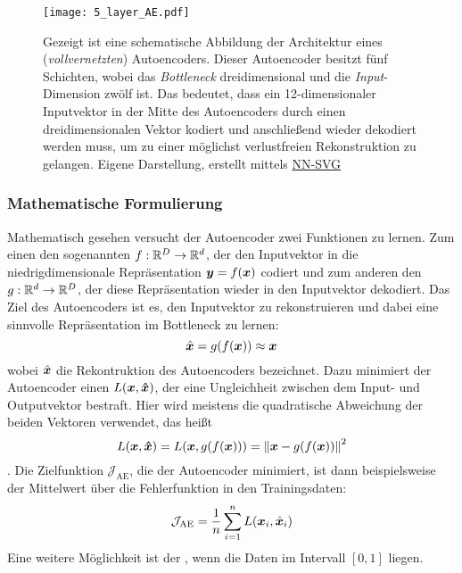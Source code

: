 \begin{figure}[h]
	\label{fig:5-layer-Autoencoder}
	\begin{center}
		\texttt{[image: 5\_layer\_AE.pdf]}
		\caption[Schematische Abbildung der Architektur eines Autoencoders]{Gezeigt ist eine schematische Abbildung der Architektur eines (\textit{vollvernetzten}) Autoencoders. Dieser Autoencoder besitzt fünf Schichten, wobei das \textit{Bottleneck} dreidimensional und die \textit{Input}-Dimension zwölf ist. Das bedeutet, dass ein 12-dimensionaler Inputvektor in der Mitte des Autoencoders durch einen dreidimensionalen Vektor kodiert und anschließend wieder dekodiert werden muss, um zu einer möglichst verlustfreien Rekonstruktion zu gelangen. Eigene Darstellung, erstellt mittels \href{https://alexlenail.me/NN-SVG/}{NN-SVG}}
	\end{center}
\end{figure}

\subsubsection{Mathematische Formulierung}
\label{ch:MethodenDerDimRed:ML:AE:MathematischeFormulierung}
Mathematisch gesehen versucht der Autoencoder zwei Funktionen zu lernen. Zum einen den sogenannten  $f: \mathbb{R}^D \rightarrow \mathbb{R}^d$, der den Inputvektor in die niedrigdimensionale Repräsentation $\bm{y} = f(\bm{x})$ codiert und zum anderen den  $g: \mathbb{R}^d \rightarrow \mathbb{R}^D$, der diese Repräsentation wieder in den Inputvektor dekodiert. Das Ziel des Autoencoders ist es, den Inputvektor zu rekonstruieren und dabei eine sinnvolle Repräsentation im Bottleneck zu lernen:
\begin{equation}
	\hat{\bm{x}} = g(f(\bm{x})) \approx \bm{x}
\end{equation}
wobei $\hat{\bm{x}}$ die Rekontruktion des Autoencoders bezeichnet.
Dazu minimiert der Autoencoder einen  $L(\bm{x}, \bm{\hat{x}})$, der eine Ungleichheit zwischen dem Input- und Outputvektor bestraft. Hier wird meistens die quadratische Abweichung der beiden Vektoren verwendet, das heißt
\begin{equation}
	\label{eq:MSE_loss}
	L(\bm{x}, \bm{\hat{x}}) = L(\bm{x}, g(f(\bm{x}))) = \left\lVert\bm{x} - g(f(\bm{x}))\right\rVert^2
\end{equation}
\parencite[507]{Goodfellow.2016}. Die Zielfunktion $\mathcal{J}_{\text{AE}}$, die der Autoencoder
minimiert, ist dann beispielsweise der Mittelwert über die Fehlerfunktion in den Trainingsdaten:
\begin{equation}
	\label{eq:AE_objectiveFunction}
	\mathcal{J}_{\text{AE}} = \frac{1}{n} \sum_{i = 1}^n L(\bm{x}_i, \hat{\bm{x}}_i)
\end{equation}
Eine weitere Möglichkeit ist der , wenn die Daten im Intervall $[0, 1]$ liegen.


